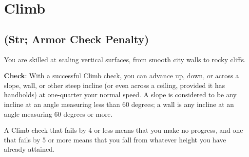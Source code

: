 \section{Climb}

\label{f0}
\subsection{(Str; Armor Check Penalty)}
				
You are skilled at scaling vertical surfaces, from smooth city walls to rocky cliffs.
				
\textbf{Check}: With a successful Climb check, you can advance up, down, or across a slope, wall, or other steep incline (or even across a ceiling, provided it has handholds) at one-quarter your normal speed. A slope is considered to be any incline at an angle measuring less than 60 degrees; a wall is any incline at an angle measuring 60 degrees or more.
				
A Climb check that fails by 4 or less means that you make no progress, and one that fails by 5 or more means that you fall from whatever height you have already attained.
				
